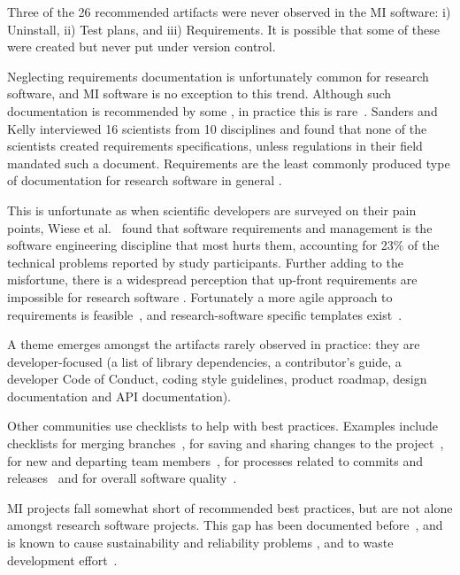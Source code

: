 \documentclass[final, 12pt, 3p, times]{elsarticle}
\begin{document}
Three of the 26 recommended artifacts were never observed in the MI software:
i) Uninstall, ii) Test plans, and iii) Requirements. It is possible that
some of these were created but never put under version control.

Neglecting requirements documentation is unfortunately common for research
software, and MI software is no exception to this trend.  Although such
documentation is recommended by some \cite{TobiasEtAl2018, HerouxEtAl2008,
SmithAndKoothoor2016}, in practice this is rare~\cite{HeatonAndCarver2015}.
Sanders and Kelly \cite{SandersAndKelly2008} interviewed 16 scientists from 10
disciplines and found that none of the scientists created requirements
specifications, unless regulations in their field mandated such a document.
Requirements are the least commonly produced type of documentation for research
software in general \cite{Nguyen-HoanEtAl2010}. 

This is unfortunate as when scientific developers are surveyed on their pain
points, Wiese et al.~\cite{WieseEtAl2019} found that software requirements and
management is the software engineering discipline that most hurts them,
accounting for 23\% of the technical problems reported by study participants.
Further adding to the misfortune, there is a widespread perception that up-front
requirements are impossible for research software \cite{CarverEtAl2007,
SegalAndMorris2008}. Fortunately a more agile approach to requirements is
feasible~\cite{Smith2016}, and research-software specific templates
exist~\cite{SmithEtAl2007}. 

A theme emerges amongst the artifacts rarely observed in practice: they
are developer-focused (a list of library dependencies, a contributor's guide,
a developer Code of Conduct, coding style guidelines, product roadmap, design
documentation and API documentation).

Other communities use checklists to help with best practices. Examples include
checklists for merging branches~\cite{Brown2015}, for saving and sharing changes
to the project~\cite{WilsonEtAl2016}, for new and departing team
members~\cite{HerouxAndBernholdt2018}, for processes related to commits and
releases~\cite{HerouxEtAl2008} and for overall software
quality~\cite{ThielEtAl2020, SSI2022}.

MI projects fall somewhat short of recommended best practices, but are not alone
amongst research software projects. This gap has been documented
before~\cite{Storer2017,JohansonAndHasselbring2018}, and is known to cause
sustainability and reliability problems \cite{FaulkEtAl2009}, and to waste
development effort~\cite{deSouzaEtAl2019}.
\end{document}
